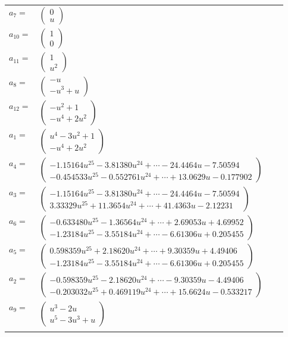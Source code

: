 \documentclass[1p]{elsarticle_modified}
\theoremstyle{definition}
\begin{document}
\begin{tabular}{m{7pt} m{180pt} m{7pt} m{180pt} }
\flushright $a_{7}=$&$\begin{pmatrix}0\\u\end{pmatrix}$ \\
\flushright $a_{10}=$&$\begin{pmatrix}1\\0\end{pmatrix}$ \\
\flushright $a_{11}=$&$\begin{pmatrix}1\\u^2\end{pmatrix}$ \\
\flushright $a_{8}=$&$\begin{pmatrix}- u\\- u^3+u\end{pmatrix}$ \\
\flushright $a_{12}=$&$\begin{pmatrix}- u^2+1\\- u^4+2 u^2\end{pmatrix}$ \\
\flushright $a_{1}=$&$\begin{pmatrix}u^4-3 u^2+1\\- u^4+2 u^2\end{pmatrix}$ \\
\flushright $a_{4}=$&$\begin{pmatrix}-1.15164 u^{25}-3.81380 u^{24}+\cdots-24.4464 u-7.50594\\-0.454533 u^{25}-0.552761 u^{24}+\cdots+13.0629 u-0.177902\end{pmatrix}$ \\
\flushright $a_{3}=$&$\begin{pmatrix}-1.15164 u^{25}-3.81380 u^{24}+\cdots-24.4464 u-7.50594\\3.33329 u^{25}+11.3654 u^{24}+\cdots+41.4363 u-2.12231\end{pmatrix}$ \\
\flushright $a_{6}=$&$\begin{pmatrix}-0.633480 u^{25}-1.36564 u^{24}+\cdots+2.69053 u+4.69952\\-1.23184 u^{25}-3.55184 u^{24}+\cdots-6.61306 u+0.205455\end{pmatrix}$ \\
\flushright $a_{5}=$&$\begin{pmatrix}0.598359 u^{25}+2.18620 u^{24}+\cdots+9.30359 u+4.49406\\-1.23184 u^{25}-3.55184 u^{24}+\cdots-6.61306 u+0.205455\end{pmatrix}$ \\
\flushright $a_{2}=$&$\begin{pmatrix}-0.598359 u^{25}-2.18620 u^{24}+\cdots-9.30359 u-4.49406\\-0.203032 u^{25}+0.469119 u^{24}+\cdots+15.6624 u-0.533217\end{pmatrix}$ \\
\flushright $a_{9}=$&$\begin{pmatrix}u^3-2 u\\u^5-3 u^3+u\end{pmatrix}$\\&\end{tabular}
\end{document}
